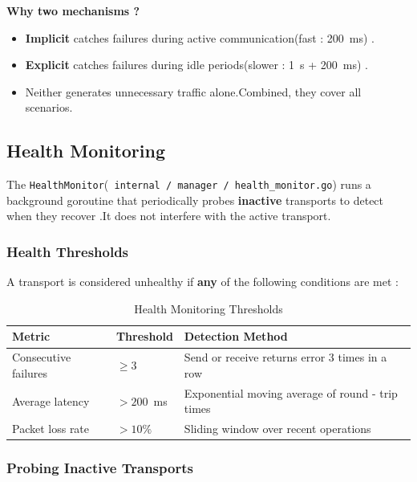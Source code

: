 \textbf{Why two mechanisms ?}
\begin{itemize}[leftmargin = 1.5em, topsep = 4pt, itemsep = 2pt]
    \item \textbf{Implicit} catches failures during active
communication(fast : 200\, ms)
    .
    \item \textbf{Explicit} catches failures during idle
    periods(slower : 1\, s + 200\, ms)
    .
    \item Neither generates unnecessary traffic alone.Combined,
    they cover all scenarios.
\end{itemize}

\subsection{Health Monitoring}

The \texttt{HealthMonitor}(\texttt{
    internal / manager / health\_monitor.go}) runs a background goroutine that
    periodically probes \textbf{inactive} transports to detect when they recover
        .It does not interfere with the active transport.

\subsubsection{Health Thresholds}

A transport is considered unhealthy
    if \textbf{any} of the following conditions are met :

\begin{table}[H]
\centering
\caption {
  Health Monitoring Thresholds
}
\label {
tab:
  health - thresholds
}
\begin{tabular} { l l l}
\toprule
\textbf{Metric} & \textbf{Threshold} & \textbf{Detection Method}
\\
\midrule Consecutive failures &$\geq 3 $ &Send or
    receive returns error 3 times in a row \\
Average latency &$ > 200 $\,
    ms &Exponential moving average of round - trip times \\
Packet loss rate &$ >
        10\% $ &Sliding window over recent operations \\
\bottomrule
\end{tabular}
\end{table}

\subsubsection{Probing Inactive Transports}

